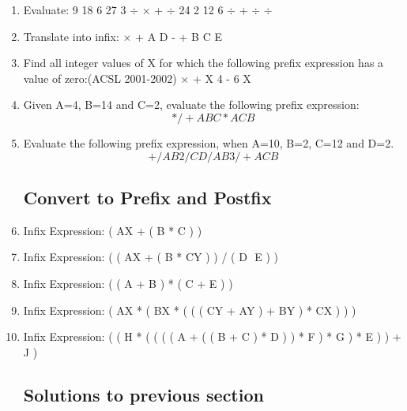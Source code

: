 \documentclass{article}
\begin{document}
\begin{enumerate}

\item Evaluate: 9 18 6 27 3 $\div$ $\times$ + $\div$ 24 2 12 6 $\div$ + $\div$ $\div$

\item Translate into infix: $\times$ + A D - + B C E

\item Find all integer values of X for which the following prefix expression has
a value of zero:(ACSL 2001-2002) $\times$ + X 4 - 6 X 

\item Given A=4, B=14 and C=2, evaluate the following prefix expression: $$* / ­ + A B C * A C B$$

\item Evaluate the following prefix expression, when A=10, B=2, C=12 and D=2. $$+ / A B 2  / ­ C D / A B 3 / + AC B$$
\subsection{Convert to Prefix and Postfix}

\item Infix Expression: ( AX + ( B * C ) ) 

\item Infix Expression: ( ( AX + ( B * CY ) ) / ( D ­ E ) ) 

\item Infix Expression: ( ( A + B ) * ( C + E ) ) 

\item Infix Expression: ( AX * ( BX * ( ( ( CY + AY ) + BY ) * CX ) ) ) 

\item Infix Expression: ( ( H * ( ( ( ( A + ( ( B + C ) * D ) ) * F ) * G ) * E ) ) + J ) 
\subsection{Solutions to previous section}


\end{enumerate}
\end{document}
